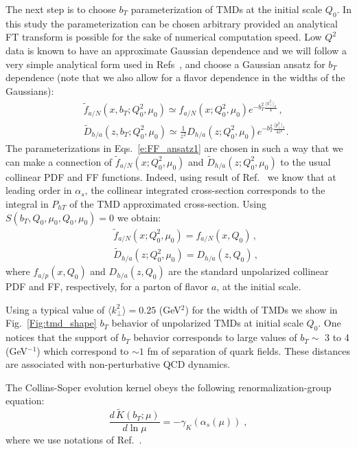 \documentclass[final,3p,times,onecolumn,sort&compress,hidelinks]{elsarticle}
\newcommand\3[1]{\boldsymbol{#1}}
\begin{document}
The next step is to choose $b_T$ parameterization of TMDs at the initial scale $Q_0$. In this study the parameterization can be chosen arbitrary provided an analytical FT transform is possible for the sake of numerical computation speed. Low $Q^2$ data is known \cite{Schweitzer:2010tt} to have an approximate Gaussian dependence and we will follow a very simple analytical form used in Refs~\cite{Anselmino:2013lza,Signori:2013mda}, and choose a Gaussian ansatz for $b_T$ dependence (note that we also allow for a flavor dependence in the widths of the Gaussians):
\begin{eqnarray}
&&\tilde f_{a/N} (x,b_T; Q_0^2, \mu_0)\simeq f_{a/N} (x; Q_0^2, \mu_0) e^{-b_T^2 \frac{\langle k_\perp^2 \rangle_a}{4}}\,,
\nonumber \\[0.3cm]
&&\tilde D_{h/a}(z,b_T; Q_0^2, \mu_0)\simeq \frac{1}{z^2} D_{h/a}(z; Q_0^2, \mu_0) e^{-b_T^2 \frac{\langle p_\perp^2 \rangle_a}{4 z^2}}.
\label{e:FF_ansatz1}
\end{eqnarray}
The parameterizations in Eqs.~\eqref{e:FF_ansatz1} are chosen in such a way that we can make a connection of $\tilde f_{a/N} (x; Q_0^2, \mu_0)$ and $\tilde D_{h/a}(z; Q_0^2, \mu_0)$ to the usual collinear PDF and FF functions. Indeed, using result of Ref.~\cite{Collins:2016hqq} we know that at leading order in $\alpha_s$, the collinear integrated cross-section corresponds to the integral in $P_{hT}$ of the TMD approximated cross-section. Using $S(b_T, Q_0, \mu_0, Q_0, \mu_0) = 0$ we obtain:
\begin{eqnarray}
&&\tilde f_{a/N} (x; Q_0^2, \mu_0) = f_{a/N} (x, Q_0)\,,
\\[0.3cm]
&&\tilde D_{h/a}(z; Q_0^2, \mu_0) = D_{h/a}(z, Q_0)\,,
\label{e:FF_ansatz2}
\end{eqnarray}
where $f_{a/p} (x, Q_0)$ and $D_{h/a}(z, Q_0)$ are the standard unpolarized collinear PDF and FF, respectively, for a parton of flavor $a$, at the initial scale.

Using a typical value of $\langle k_\perp^2 \rangle = 0.25$ (GeV$^2$) \cite{Anselmino:2005nn} for the width of TMDs we show in Fig.~\ref{Fig:tmd_shape} $b_T$ behavior of unpolarized TMDs at initial scale $Q_0$. One notices that the support of $b_T$ behavior corresponds to large values of $b_T \sim $ 3 to 4 (GeV$^{-1}$) which correspond to $\sim 1$ fm of separation of quark fields. These distances are associated with non-perturbative QCD dynamics.

The Collins-Soper evolution kernel obeys the following renormalization-group equation:
\begin{equation}
\frac{d\, \tilde K (b_T;\mu)}{d \ln \mu} = - \gamma_K (\alpha_s(\mu)) \; ,
\end{equation} 
where we use notations of Ref.~\cite{Collins:2011zzd}.
\end{document}
